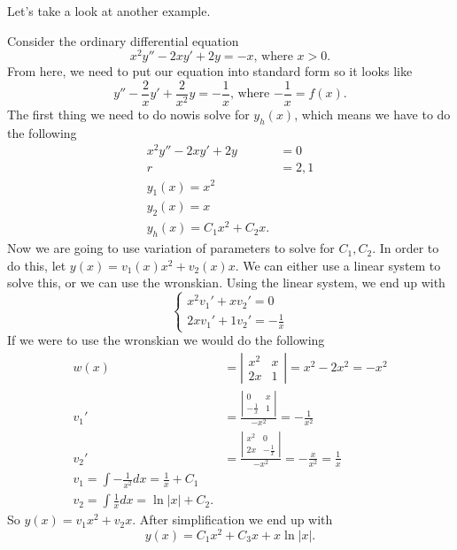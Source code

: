 Let's take a look at another example.
\begin{eg}
  Consider the ordinary differential equation 
  \[
    x^2y''-2xy'+2y=-x\text{, where }x>0
  .\] 
  From here, we need to put our equation into standard form so it looks like 
  \[
    y''-\frac{2}{x}y'+\frac{2}{x^2}y=-\frac{1}{x}\text{, where $-\frac{1}{x}=f(x)$}
  .\] 
  The first thing we need to do nowis solve for $y_h(x)$, which means we have to do the following
  \begin{align*}
    x^2y''-2xy'+2y&=0\\
    r&=2,1\\
    y_1(x)=x^2\\
    y_2(x)=x\\
    y_h(x)=C_1x^2+C_2x
  .\end{align*}
  Now we are going to use variation of parameters to solve for $C_1,C_2$. In order to do this, let $y(x)=v_1(x)x^2+v_2(x)x$. We can either use a linear system to solve this, or we can use the wronskian. Using the linear system, we end up with 
  \begin{equation*}
    \begin{cases}
      x^2v_1'+xv_2'=0\\
      2xv_1'+1v_2'=-\frac{1}{x}
    \end{cases}
  \end{equation*}
  If we were to use the wronskian we would do the following
  \begin{align*}
    w(x)&=\left| \begin{matrix} x^2&x\\2x&1 \end{matrix} \right| =x^2-2x^2=-x^2\\
    v_1'&= \frac{\left| \begin{matrix} 0&x\\-\frac{1}{x}&1 \end{matrix} \right| }{-x^2}=-\frac{1}{x^2}\\
    v_2'&=\frac{\left| \begin{matrix} x^2&0\\2x&-\frac{1}{x} \end{matrix} \right| }{-x^2}=-\frac{x}{x^2}=\frac{1}{x}\\
    v_1=\int-\frac{1}{x^2}dx=\frac{1}{x}+C_1\\
    v_2=\int \frac{1}{x}dx=\ln|x|+C_2
  .\end{align*}
  So $y(x)=v_1x^2+v_2x$. After simplification we end up with 
  \[
    y(x)=C_1x^2+C_3x+x\ln|x|
  .\] 
\end{eg}
